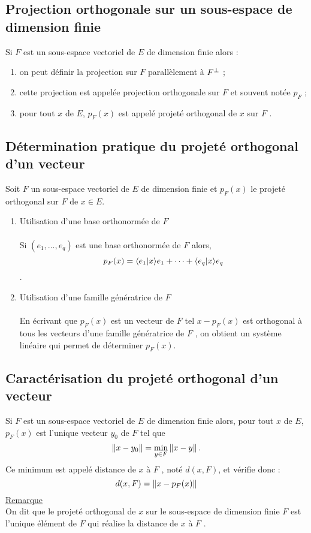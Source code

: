\subsection{Projection orthogonale sur un sous-espace de dimension finie}
\begin{defprop}
    Si \(F\) est un sous-espace vectoriel de \(E\) de dimension finie alors :
    \begin{enumerate}
        \item on peut définir la projection sur \(F\) parallèlement à \(F^{\perp}\) ;
        \item cette projection est appelée projection orthogonale sur \(F\) et souvent notée \(p_F\) ;
        \item pour tout \(x\) de \(E\), \(p_F (x)\) est appelé projeté orthogonal de \(x\) sur \(F\) .
    \end{enumerate}
\end{defprop}
\subsection{Détermination pratique du projeté orthogonal d’un vecteur}
\begin{defprop}
    Soit \(F\) un sous-espace vectoriel de \(E\) de dimension finie et \(p_F (x)\) le projeté orthogonal sur \(F\) de \(x \in E\).
    \begin{enumerate}
    \item Utilisation d’une base orthonormée de \(F\)\\~\\
        Si \((e_1, \dots , e_q)\) est une base orthonormée de \(F\) alors,
            \[p_F (x) = \langle e_1 | x \rangle e_1 + \dots + \langle e_q | x \rangle e_q\].
    \item Utilisation d’une famille génératrice de \(F\)\\~\\
        En écrivant que \(p_F (x)\) est un vecteur de \(F\) tel \(x - p_F (x)\) est orthogonal à tous les vecteurs d’une famille génératrice de \(F\) , on obtient un système linéaire qui permet de déterminer \(p_F (x)\).
    \end{enumerate}
\end{defprop}
\subsection{Caractérisation du projeté orthogonal d’un vecteur}
\begin{defprop}
    Si \(F\) est un sous-espace vectoriel de \(E\) de dimension finie alors, pour tout \(x\) de \(E\), \(p_F (x)\) est l’unique vecteur \(y_0\) de \(F\) tel que
    \[\left\|x - y_0\right\| = \min_{y\in F} \left\|x-y\right\| .\]
    Ce minimum est appelé distance de \(x\) à \(F\) , noté \(d(x, F )\), et vérifie donc :
    \[d(x, F ) = \left\|x - p_F (x)\right\|\]
    \underline{Remarque}\\
    On dit que le projeté orthogonal de \(x\) sur le sous-espace de dimension finie \(F\) est l’unique élément de \(F\) qui réalise la distance de \(x\) à \(F\) .
\end{defprop}
